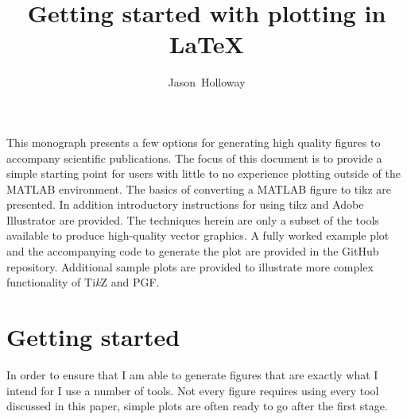 \documentclass[journal,10pt]{IEEEtran}
\newcommand{\tikz}{\textup{Ti\textit{k}Z}\xspace}
\begin{document}
%
\title{Getting started with plotting in \LaTeX}
%
\author{Jason~Holloway}%

\IEEEpeerreviewmaketitle

\ifCLASSOPTIONcaptionsoff
  \newpage
\fi


\maketitle

This monograph presents a few options for generating high quality figures to accompany scientific publications. The focus of this document is to provide a simple starting point for users with little to no experience plotting outside of the MATLAB environment. The basics of converting a MATLAB figure to tikz are presented. In addition introductory instructions for using tikz and Adobe Illustrator are provided.
The techniques herein are only a subset of the tools available to produce high-quality vector graphics.
A fully worked example plot and the accompanying code to generate the plot are provided in the GitHub repository.
Additional sample plots are provided to illustrate more complex functionality of \tikz and PGF.

\section{Getting started}
In order to ensure that I am able to generate figures that are exactly what I intend for I use a number of tools.
Not every figure requires using every tool discussed in this paper, simple plots are often ready to go after the first stage.
\end{document}
